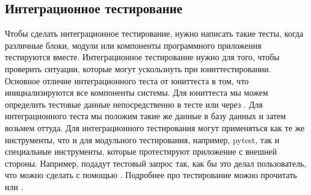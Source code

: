 \documentclass[letterpaper,10pt,russian]{sphinxmanual}
\begin{document}
\subsection{Интеграционное тестирование}
\label{\detokenize{educational_materials/testing/content:id7}}
\sphinxAtStartPar
Чтобы сделать интеграционное тестирование, нужно написать такие тесты, когда различные блоки, модули или компоненты программного приложения тестируются вместе. Интеграционное тестирование нужно для того, чтобы проверить ситуации, которые могут ускользнуть при юнит\sphinxhyphen{}тестировании. Основное отличие интеграционного теста от юнит\sphinxhyphen{}теста в том, что инициализируются все компоненты системы. Для юнит\sphinxhyphen{}теста мы можем определить тестовые данные непосредственно в тесте или через . Для интеграционного теста мы положим такие же данные в базу данных и затем возьмем оттуда. Для интеграционного тестирования могут применяться как те же инструменты, что и для модульного тестирования, например, pytest, так и специальные инструменты, которые протестируют приложение с внешней стороны. Например, подадут тестовый запрос так, как бы это делал пользователь, что можно сделать с помощью . Подробнее про тестирование можно прочитать  или .

\sphinxAtStartPar
{}
\end{document}
